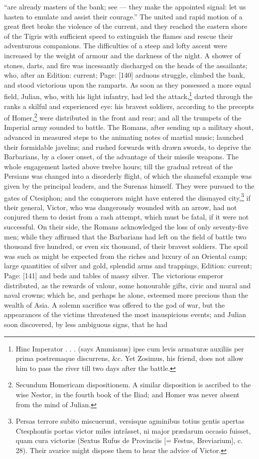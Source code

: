 \texthebrew{“}are already masters of the bank; see \texthebrew{—} they make the appointed signal: let us hasten to emulate and assist their courage.\texthebrew{}” The united and rapid motion of a great fleet broke the violence of the current, and they reached the eastern shore of the Tigris with sufficient speed to extinguish the flames and rescue their adventurous companions. The difficulties of a steep and lofty ascent were increased by the weight of armour and the darkness of the night. A shower of stones, darts, and fire was incessantly discharged on the heads of the assailants; who, after an Edition: current; Page: [140] arduous struggle, climbed the bank, and stood victorious upon the ramparts. As soon as they possessed a more equal field, Julian, who, with his light infantry, had led the attack,\footnote{Hinc Imperator . . . (says Ammianus) ipse cum levis armaturæ auxiliis per prima postremaque discurrens, \&c. Yet Zosimus, his friend, does not allow him to pass the river till two days after the battle.} darted through the ranks a skilful and experienced eye: his bravest soldiers, according to the precepts of Homer,\footnote{Secundum Homericam dispositionem. A similar disposition is ascribed to the wise Nestor, in the fourth book of the Iliad; and Homer was never absent from the mind of Julian.} were distributed in the front and rear; and all the trumpets of the Imperial army sounded to battle. The Romans, after sending up a military shout, advanced in measured steps to the animating notes of martial music; launched their formidable javelins; and rushed forwards with drawn swords, to deprive the Barbarians, by a closer onset, of the advantage of their missile weapons. The whole engagement lasted above twelve hours; till the gradual retreat of the Persians was changed into a disorderly flight, of which the shameful example was given by the principal leaders, and the Surenas himself. They were pursued to the gates of Ctesiphon; and the conquerors might have entered the dismayed city,\footnote{Persas terrore subito miscuerunt, versisque agminibus totius gentis apertas Ctesphontis portas victor miles intrâsset, ni major prædarum occasio fuisset, quam cura victoriæ (Sextus Rufus de Provinciis [= Festus, Breviarium], c. 28). Their avarice might dispose them to hear the advice of Victor.} if their general, Victor, who was dangerously wounded with an arrow, had not conjured them to desist from a rash attempt, which must be fatal, if it were not successful. On their side, the Romans acknowledged the loss of only seventy-five men; while they affirmed that the Barbarians had left on the field of battle two thousand five hundred, or even six thousand, of their bravest soldiers. The spoil was such as might be expected from the riches and luxury of an Oriental camp; large quantities of silver and gold, splendid arms and trappings, Edition: current; Page: [141] and beds and tables of massy silver. The victorious emperor distributed, as the rewards of valour, some honourable gifts, civic and mural and naval crowns; which he, and perhaps he alone, esteemed more precious than the wealth of Asia. A solemn sacrifice was offered to the god of war, but the appearances of the victims threatened the most inauspicious events; and Julian soon discovered, by less ambiguous signs, that he had 